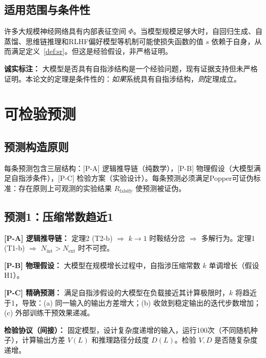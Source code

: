 \documentclass[12pt,a4paper]{article}
\theoremstyle{definition}
\newcommand{\mPhi}{\Phi}
\newcommand{\Nint}{N_{\mathrm{int}}}
\newcommand{\Next}{N_{\mathrm{ext}}}
\begin{document}
\subsection{适用范围与条件性}

许多大规模神经网络具有内部表征空间 $\mPhi$。当模型规模足够大时，自回归生成、自蒸馏、思维链推理和RLHF偏好模型等机制可能使损失函数的值 $s$ 依赖于自身，从而满足定义~\ref{def:sr}。但这是经验假设，非严格证明。

\textbf{诚实标注：} 大模型是否具有自指涉结构是一个经验问题，现有证据支持但未严格证明。本论文的定理是条件性的：\emph{如果}系统具有自指涉结构，\emph{则}定理成立。

\section{可检验预测}
\label{sec:predictions}

\subsection{预测构造原则}

每条预测包含三层结构：[P-A] 逻辑推导链（纯数学），[P-B] 物理假设（大模型满足自指涉条件），[P-C] 检验方案（实验设计）。每条预测必须满足Popper可证伪标准：存在原则上可观测的实验结果 $R_{\mathrm{falsify}}$ 使预测被证伪。

\subsection{预测1：压缩常数趋近1}

\textbf{[P-A] 逻辑推导链：} 定理2 (T2-b) $\Rightarrow$ $k \to 1$ 时鞍结分岔 $\Rightarrow$ 多解行为。定理1 (T1-b) $\Rightarrow$ $\Nint > \Next$ 时不可控。

\textbf{[P-B] 物理假设：} 大模型在规模增长过程中，自指涉压缩常数 $k$ 单调增长（假设H1）。

\textbf{[P-C] 精确预测：} 满足自指涉假设的大模型在负载接近其计算极限时，$k$ 将趋近于1，导致：(a) 同一输入的输出方差增大；(b) 收敛到稳定输出的迭代步数增加；(c) 外部训练干预效果递减。

\textbf{检验协议（间接）：} 固定模型，设计复杂度递增的输入，运行100次（不同随机种子），计算输出方差 $V(L)$ 和推理路径分歧度 $D(L)$。检验 $V, D$ 是否随复杂度递增。
\end{document}

